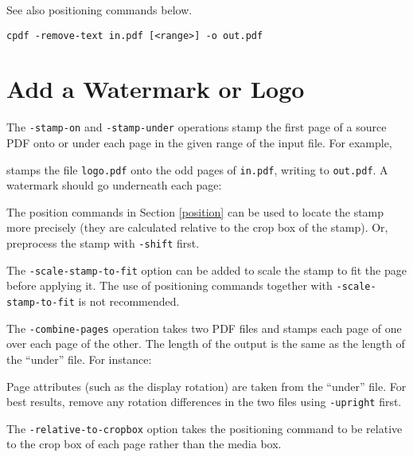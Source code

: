 \documentclass{book}
\begin{document}
{{  \noindent See also positioning commands below.

  \vspace{1.5mm}
  \noindent\small\texttt{cpdf -remove-text in.pdf [<range>] -o out.pdf}
  }}
\section{Add a Watermark or Logo}
  The \texttt{-stamp-on} and \texttt{-stamp-under} operations stamp the first
page of a source PDF onto or under each page in the given range of the input
file. For example,

\noindent{}

\noindent stamps the file \texttt{logo.pdf} onto the odd pages of \texttt{in.pdf},
writing to \texttt{out.pdf}. A watermark should go underneath each page:

\noindent{}


\noindent The position commands in Section \ref{position} can be used to locate the stamp more precisely (they are calculated relative to the crop box of the stamp). Or, preprocess the stamp with \texttt{-shift} first.

The \texttt{-scale-stamp-to-fit} option can be added to scale the stamp to fit the page before applying it. The use of positioning commands together with \texttt{-scale-stamp-to-fit} is not recommended.

  The \texttt{-combine-pages} operation takes two PDF files and stamps each
page of one over each page of the other. The length of the output is the same
as the length of the ``under'' file. For instance:

\noindent{}

\noindent Page attributes (such as the display rotation) are taken from the ``under''
file. For best results, remove any rotation differences in the two files using
\texttt{-upright} first.

\noindent The \texttt{-relative-to-cropbox} option takes the positioning command to be relative to the crop box of each page rather than the media box.
\end{document}
